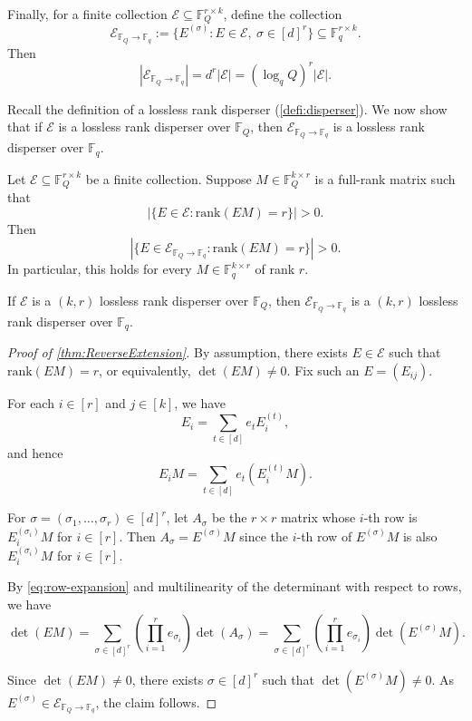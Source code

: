 \documentclass[11pt]{article}
\newcommand{\rank}{\mathrm{rank}}
\newcommand{\F}{\mathbb{F}}
\begin{document}
Finally, for a finite collection $\mathcal{E}\subseteq\F_Q^{r\times k}$, define the collection
\[
\mathcal{E}_{\F_Q\to\F_q}
:= \{E^{(\sigma)} : E\in \mathcal{E},\ \sigma\in [d]^r\}
\subseteq \F_q^{r\times k}.
\]
Then
\[
|\mathcal{E}_{\F_Q\to\F_q}|= d^r |\mathcal{E}| = (\log_q Q)^r |\mathcal{E}|.
\]

Recall the definition of a lossless rank disperser (\cref{defi:disperser}). 
We now show that if $\mathcal{E}$ is a lossless rank disperser over $\F_Q$, then $\mathcal{E}_{\F_Q\to\F_q}$ is a lossless rank disperser over $\F_q$.
 
\begin{theorem} \label{thm:ReverseExtension}
Let $\mathcal{E}\subseteq\F_Q^{r\times k}$ be a finite collection.
Suppose $M\in \F_Q^{k\times r}$ is a full-rank matrix such that
\[
|\{E\in \mathcal{E}:\rank(EM)=r\}|>0.
\]
Then
\[
|\{E\in \mathcal{E}_{\F_Q\to\F_q}:\rank(EM)=r\}|>0.
\]
In particular, this holds for every $M\in \F_q^{k\times r}$ of rank $r$.
\end{theorem}

\begin{corollary}\label{cor:field-reduction}
If $\mathcal{E}$ is a $(k,r)$ lossless rank disperser over $\F_Q$, then $\mathcal{E}_{\F_Q\to\F_q}$ is a $(k,r)$ lossless rank disperser over $\F_q$.
\end{corollary}

\begin{proof}[Proof of \cref{thm:ReverseExtension}]
By assumption, there exists $E\in\mathcal{E}$ such that $\rank(EM)=r$, or equivalently, $\det(EM)\neq 0$. Fix such an $E=(E_{ij})$.

For each $i\in [r]$ and $j\in [k]$, we have
\[
E_i = \sum_{t\in [d]} e_{t} E_i^{(t)},
\]
and hence
\begin{equation}\label{eq:row-expansion}
E_i M = \sum_{t\in [d]} e_{t} \left(E_i^{(t)} M\right).
\end{equation}

For $\sigma=(\sigma_1,\dots,\sigma_r)\in [d]^r$, let $A_\sigma$ be the $r\times r$ matrix whose $i$-th row is $E_i^{(\sigma_i)} M$ for $i\in [r]$. Then $A_\sigma = E^{(\sigma)} M$ since the $i$-th row of $E^{(\sigma)} M$ is also $E_i^{(\sigma_i)} M$ for $i\in [r]$.

By \eqref{eq:row-expansion} and multilinearity of the determinant with respect to rows, we have
\[
\det(EM)
= \sum_{\sigma\in [d]^r}
\left(\prod_{i=1}^r e_{\sigma_i}\right)\det(A_\sigma)
= \sum_{\sigma\in [d]^r}
\left(\prod_{i=1}^r e_{\sigma_i}\right)\det(E^{(\sigma)} M).
\]

Since $\det(EM)\neq 0$, there exists $\sigma\in [d]^r$ such that $\det(E^{(\sigma)} M)\neq 0$. As $E^{(\sigma)}\in \mathcal{E}_{\F_Q\to\F_q}$, the claim follows.
\end{proof}
\end{document}

